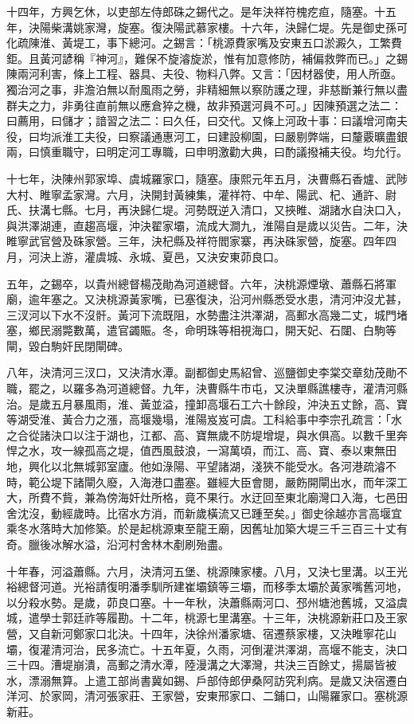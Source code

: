 \begin{pinyinscope}
十四年，方興乞休，以吏部左侍郎硃之錫代之。是年決祥符槐疙疸，隨塞。十五年，決陽柴溝姚家灣，旋塞。復決陽武慕家樓。十六年，決歸仁堤。先是御史孫可化疏陳淮、黃堤工，事下總河。之錫言：「桃源費家嘴及安東五口淤澱久，工繁費鉅。且黃河諺稱『神河』，難保不旋濬旋淤，惟有加意修防，補偏救弊而已。」之錫陳兩河利害，條上工程、器具、夫役、物料八弊。又言：「因材器使，用人所亟。獨治河之事，非澹泊無以耐風雨之勞，非精細無以察防護之理，非慈斷兼行無以盡群夫之力，非勇往直前無以應倉猝之機，故非預選河員不可。」因陳預選之法二：曰薦用，曰儲才；諳習之法二：曰久任，曰交代。又條上河政十事：曰議增河南夫役，曰均派淮工夫役，曰察議通惠河工，曰建設柳園，曰嚴剔弊端，曰釐覈曠盡銀兩，曰慎重職守，曰明定河工專職，曰申明激勸大典，曰酌議撥補夫役。均允行。

十七年，決陳州郭家埠、虞城羅家口，隨塞。康熙元年五月，決曹縣石香爐、武陟大村、睢寧孟家灣。六月，決開封黃練集，灌祥符、中牟、陽武、杞、通許、尉氏、扶溝七縣。七月，再決歸仁堤。河勢既逆入清口，又挾睢、湖諸水自決口入，與洪澤湖連，直趨高堰，沖決翟家壩，流成大澗九，淮陽自是歲以災告。二年，決睢寧武官營及硃家營。三年，決杞縣及祥符閻家寨，再決硃家營，旋塞。四年四月，河決上游，灌虞城、永城、夏邑，又決安東茆良口。

五年，之錫卒，以貴州總督楊茂勛為河道總督。六年，決桃源煙墩、蕭縣石將軍廟，逾年塞之。又決桃源黃家嘴，已塞復決，沿河州縣悉受水患，清河沖沒尤甚，三汊河以下水不沒骭。黃河下流既阻，水勢盡注洪澤湖，高郵水高幾二丈，城門堵塞，鄉民溺斃數萬，遣官蠲賑。冬，命明珠等相視海口，開天妃、石闥、白駒等閘，毀白駒奸民閉閘碑。

八年，決清河三汊口，又決清水潭。副都御史馬紹曾、巡鹽御史李棠交章劾茂勛不職，罷之，以羅多為河道總督。九年，決曹縣牛市屯，又決單縣譙樓寺，灌清河縣治。是歲五月暴風雨，淮、黃並溢，撞卸高堰石工六十餘段，沖決五丈餘，高、寶等湖受淮、黃合力之漲，高堰幾塌，淮陽岌岌可虞。工科給事中李宗孔疏言：「水之合從諸決口以注于湖也，江都、高、寶無歲不防堤增堤，與水俱高。以數千里奔悍之水，攻一線孤高之堤，值西風鼓浪，一瀉萬頃，而江、高、寶、泰以東無田地，興化以北無城郭室廬。他如淥陽、平望諸湖，淺狹不能受水。各河港疏濬不時，範公堤下諸閘久廢，入海港口盡塞。雖經大臣會閱，嚴飭開閘出水，而年深工大，所費不貲，兼為傍海奸灶所格，竟不果行。水迂回至東北廟灣口入海，七邑田舍沈沒，動經歲時。比宿水方消，而新歲橫流又已踵至矣。」御史徐越亦言高堰宜乘冬水落時大加修築。於是起桃源東至龍王廟，因舊址加築大堤三千三百三十丈有奇。臘後冰解水溢，沿河村舍林木剷刷殆盡。

十年春，河溢蕭縣。六月，決清河五堡、桃源陳家樓。八月，又決七里溝。以王光裕總督河道。光裕請復明潘季馴所建崔壩鎮等三壩，而移季太壩於黃家嘴舊河地，以分殺水勢。是歲，茆良口塞。十一年秋，決蕭縣兩河口、邳州塘池舊城，又溢虞城，遣學士郭廷祚等履勘。十二年，桃源七里溝塞。十三年，決桃源新莊口及王家營，又自新河鄭家口北決。十四年，決徐州潘家塘、宿遷蔡家樓，又決睢寧花山壩，復灌清河治，民多流亡。十五年夏，久雨，河倒灌洪澤湖，高堰不能支，決口三十四。漕堤崩潰，高郵之清水潭，陸漫溝之大澤灣，共決三百餘丈，揚屬皆被水，漂溺無算。上遣工部尚書冀如錫、戶部侍郎伊桑阿訪究利病。是歲又決宿遷白洋河、於家岡，清河張家莊、王家營，安東邢家口、二鋪口，山陽羅家口。塞桃源新莊。


\end{pinyinscope}
